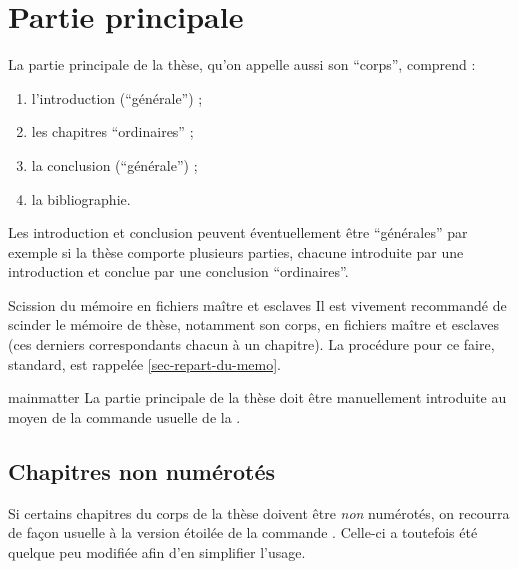 \chapter{Partie principale}\label{cha-corps}

La partie principale de la thèse, qu'on appelle aussi son \enquote{corps},
comprend :
\begin{enumerate}
\item l'introduction (\enquote{générale}) ;
\item les chapitres \enquote{ordinaires} ;
\item la conclusion (\enquote{générale}) ;
\item la bibliographie.
\end{enumerate}
Les introduction et conclusion peuvent éventuellement être
\enquote{générales} par exemple si la thèse comporte plusieurs
parties, chacune introduite par une introduction et conclue par
une conclusion \enquote{ordinaires}.

\begin{dbremark}{Scission du mémoire en fichiers maître et esclaves}{}
  Il est vivement recommandé de scinder le mémoire de thèse,
  notamment son corps, en fichiers maître et esclaves (ces derniers
  correspondants chacun à un chapitre). La procédure
  pour ce faire, standard, est rappelée \vref{sec-repart-du-memo}.
\end{dbremark}

\begin{docCommand}[doc description=\mandatory]{mainmatter}{}
  La partie principale de la thèse doit être manuellement introduite au moyen
  de la commande usuelle  de la
  \nofrontmatter.
\end{docCommand}

\section{Chapitres non numérotés}
\label{sec-chap-non-numer}

Si certains chapitres du corps de la thèse  doivent être \emph{non} numérotés, on recourra de
façon usuelle à la version étoilée de la commande
. Celle-ci a toutefois été quelque peu modifiée afin
d'en simplifier l'usage.


